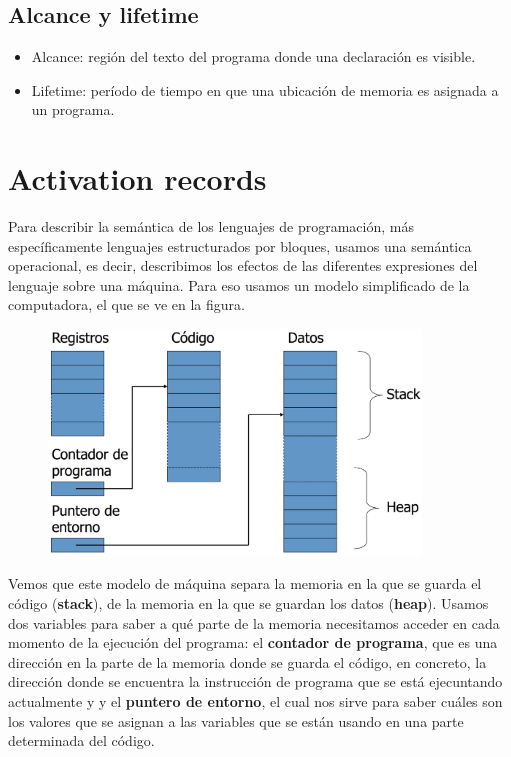 \documentclass[10pt,a4paper]{report}
\begin{document}
\subsection{Alcance y lifetime}
\begin{itemize}
\item Alcance: región del texto del programa donde una declaración es 
visible.
\item Lifetime: período de tiempo en que una ubicación de memoria es asignada a un programa.
\end{itemize}

\section{Activation records}

\par Para describir la semántica de los lenguajes de programación, más 
específicamente lenguajes estructurados por bloques, usamos una 
semántica operacional, es decir, describimos los efectos de las diferentes 
expresiones del lenguaje sobre una máquina. Para eso usamos un modelo 
simplificado de la computadora, el que se ve en la figura.

\begin{center} 
	\includegraphics[width=12cm, height=6cm]{arecord.png}
\end{center}

\par Vemos que este modelo de máquina separa la memoria en la que se 
guarda el código (\textbf{stack}), de la memoria en la que se guardan los 
datos (\textbf{heap}). Usamos dos variables para saber a qué parte de la 
memoria necesitamos acceder en cada momento de la ejecución del 
programa: el \textbf{contador de programa}, que es una dirección en la 
parte de la memoria donde se guarda el código, en concreto, la dirección 
donde se encuentra la instrucción de programa que se está ejecuntando 
actualmente y y el \textbf{puntero de entorno}, el cual nos sirve para 
saber cuáles son los valores que se asignan a las variables que se están 
usando en una parte determinada del código. 
\end{document}
